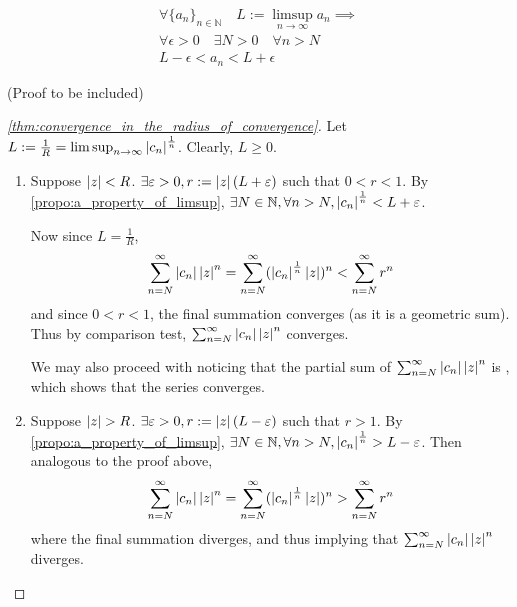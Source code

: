 \documentclass[11pt, oneside]{book}
\begin{document}
\begin{propo}\label{propo:a_property_of_limsup}\begin{gather*}
		\forall \{a_n\}_{n \in \mathbb{N}} \quad L := \limsup_{n \to \infty} a_n \implies \\
		\forall \epsilon > 0 \quad \exists N > 0 \quad \forall n > N \\
		L - \epsilon < a_n < L + \epsilon
	\end{gather*}
\end{propo}

(Proof to be included)

\begin{proof}[\cref{thm:convergence_in_the_radius_of_convergence}]
	Let $L := \frac{1}{R} = \limsup_{n \to \infty} \left|c_n\right|^\frac{1}{n}$. Clearly, $L \geq 0$.
	\begin{enumerate}
		\item Suppose $\left|z\right| < R$. $\exists \varepsilon > 0, r := \left|z\right|(L + \varepsilon)$ such that $0 < r < 1$. By \cref{propo:a_property_of_limsup}, $\exists N \in \mathbb{N}, \forall n > N, \left|c_n\right|^\frac{1}{n} < L + \varepsilon$.

		Now since $L = \frac{1}{R}$,
		\begin{equation*}
			\sum_{n=N}^{\infty} \left|c_n\right|\left|z\right|^n = \sum_{n=N}^{\infty} (\left|c_n\right|^\frac{1}{n} \left|z\right|)^n < \sum_{n=N}^{\infty} r^n
		\end{equation*}
		and since $0 < r < 1$, the final summation converges (as it is a geometric sum). Thus by comparison test, $\sum_{n=N}^{\infty} \left|c_n\right| \left|z\right|^n$ converges.

		We may also proceed with noticing that the partial sum of $\sum_{n=N}^{\infty} \left|c_n\right|\left|z\right|^n$ is , which shows that the series converges.

		\item Suppose $\left|z\right| > R$. $\exists \varepsilon > 0, r := \left|z\right|(L - \varepsilon)$ such that $r > 1$. By \cref{propo:a_property_of_limsup}, $\exists N \in \mathbb{N}, \forall n > N, \left|c_n\right|^\frac{1}{n} > L - \varepsilon$. Then analogous to the proof above,
		\begin{equation*}
			\sum_{n=N}^{\infty} \left|c_n\right|\left|z\right|^n = \sum_{n=N}^{\infty} (\left|c_n\right|^\frac{1}{n} \left|z\right|)^n > \sum_{n=N}^{\infty} r^n
		\end{equation*}
		where the final summation diverges, and thus implying that $\sum_{n=N}^{\infty} \left|c_n\right|\left|z\right|^n$ diverges.
	\end{enumerate}
\end{proof}
\end{document}
